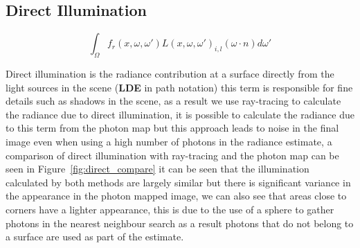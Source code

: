 \subsection{Direct Illumination}
\begin{equation*}
			\int_{\Omega}
				f_{r}(x, \omega, \omega')
				L(x,\omega,\omega')_{i,l}
				(\omega \cdot n)d\omega'
\end{equation*}

Direct illumination is the radiance contribution at a surface directly from the light sources in the scene
(\textbf{LDE} in path notation) this term is responsible for fine details such as shadows in the scene, as a
result we use ray-tracing to calculate
the radiance due to direct illumination, it is possible to calculate the radiance due to this term from the photon map but this
approach leads to noise in the final image even when using a high number of photons in the radiance estimate, a comparison of
direct illumination with ray-tracing and the photon map can be seen in Figure~\ref{fig:direct_compare} it can be seen that
the illumination calculated by both methods are largely similar but there is significant variance in the appearance in the
photon mapped image, we can also see that areas close to corners have a lighter appearance, this is due to the use of a
sphere to gather photons in the nearest neighbour search as a result photons that do not belong to a surface are used
as part of the estimate.

